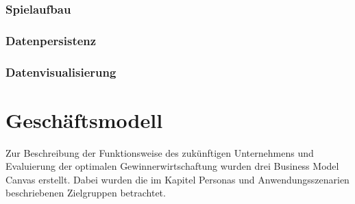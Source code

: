 \documentclass[10pt, a4paper, oneside, titlepage]{scrartcl} %
\begin{document}
	\subsubsection{Spielaufbau}
	
	
	\subsubsection{Datenpersistenz}
	
	
	\subsubsection{Datenvisualisierung}
   	
   	\section{Geschäftsmodell}
   	Zur Beschreibung der Funktionsweise des zukünftigen Unternehmens und Evaluierung der optimalen Gewinnerwirtschaftung wurden drei Business Model Canvas erstellt. Dabei wurden die im Kapitel Personas und Anwendungsszenarien beschriebenen Zielgruppen betrachtet.
\end{document}
